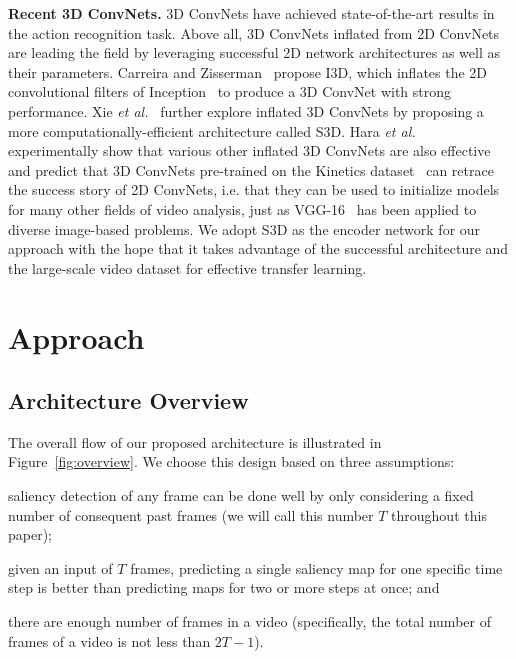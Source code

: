\documentclass[10pt,twocolumn,letterpaper]{article}
\begin{document}
\textbf{Recent 3D ConvNets.} 3D ConvNets have achieved state-of-the-art results in the action recognition task. Above all, 3D ConvNets inflated from 2D ConvNets are leading the field by leveraging successful 2D network architectures as well as their parameters. Carreira and Zisserman~\cite{carreira2017quo} propose I3D, which inflates the 2D convolutional filters of Inception~\cite{szegedy2015going} to produce a 3D ConvNet with strong performance. Xie \textit{et al.}~\cite{xie2018rethinking} further explore inflated 3D ConvNets by proposing a more computationally-efficient architecture called S3D. Hara \textit{et al.}~\cite{hara2018can} experimentally show that various other inflated 3D ConvNets are also effective and predict that 3D ConvNets pre-trained on the Kinetics dataset~\cite{kay2017kinetics} can retrace the success story of 2D ConvNets, i.e. that they can be used to initialize models for many other fields of video analysis, just as VGG-16~\cite{simonyan2014very} has been applied to diverse image-based problems. We adopt S3D as the encoder network for our approach with the hope that it takes advantage of the successful architecture and the large-scale video dataset for effective transfer learning. 
\section{Approach} \label{sec:approach}

\subsection{Architecture Overview} \label{subsec:overview}

The overall flow of our proposed architecture is illustrated in Figure~\ref{fig:overview}. We choose this design based on three assumptions:
\begin{inlinelist}
  \item saliency detection of any frame can be done well by only considering a fixed number of consequent past frames (we will call this number $T$ throughout this paper);
  \item given an input of $T$ frames, predicting a single saliency map for one specific time step is better than predicting maps for two or more steps at once; and
  \item there are enough number of frames in a video (specifically, the total number of frames of a video is not less than $2T-1$).
\end{inlinelist}
\end{document}
